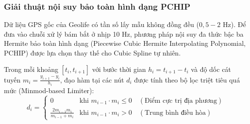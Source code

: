 \begin{table}[H]
\centering
\caption{Thống kê định lượng 252 phân đoạn người đi bộ Geolife sau khi chuẩn hóa}
\label{tab:geolife-clean-stats}
\end{table}

\subsubsection{Giải thuật nội suy bảo toàn hình dạng PCHIP}

\hspace{0.5cm} Dữ liệu GPS gốc của Geolife có tần số lấy mẫu không đồng đều ($0{,}5 - 2$ Hz). Để đưa vào chuỗi xử lý bám bắt ở nhịp 10 Hz, phương pháp nội suy đa thức bậc ba Hermite bảo toàn hình dạng (Piecewise Cubic Hermite Interpolating Polynomial, PCHIP) được lựa chọn thay thế cho Cubic Spline tự nhiên.

Trong mỗi khoảng $[t_i, t_{i+1}]$ với bước thời gian $h_i = t_{i+1} - t_i$ và độ dốc cát tuyến $m_i = \frac{y_{i+1} - y_i}{h_i}$, đạo hàm tại các nút $d_i$ được tính theo bộ lọc triệt tiêu quá mức (Minmod-based Limiter):
\begin{equation}
d_i = \begin{cases}
0 & \text{khi } m_{i-1} \cdot m_i \le 0 \quad (\text{Điểm cực trị địa phương}) \\
\frac{2 m_{i-1} m_i}{m_{i-1} + m_i} & \text{khi } m_{i-1} \cdot m_i > 0 \quad (\text{Trung bình điều hòa})
\end{cases}
\label{eq:pchip-derivative-formula}
\end{equation}


